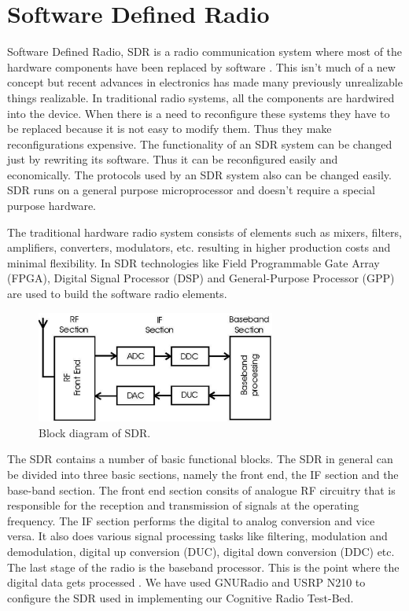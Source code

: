 \chapter{Software Defined Radio}

Software Defined Radio, SDR is a radio communication system where most of the 
hardware components have been replaced by software \cite{wikiSDR}. This isn't
much of a new concept but recent advances in electronics has made many
previously unrealizable things realizable. In traditional
radio systems, all the components are hardwired into the device. When there is
a need to reconfigure these systems they have to be replaced because it is
not easy to modify them. Thus they make reconfigurations expensive. The 
functionality of an SDR system can be changed just by rewriting its software.
Thus it can be reconfigured easily and economically.
The protocols used by an SDR system also can be changed
easily. SDR runs on a general
purpose microprocessor and doesn't require a special purpose hardware.

The traditional hardware radio system consists of elements such as mixers, 
filters, amplifiers, converters, modulators, etc. resulting in higher 
production costs and minimal flexibility. In SDR technologies like 
Field Programmable Gate Array (FPGA), Digital Signal Processor (DSP) and 
General-Purpose Processor (GPP) are used to build the software radio elements.


\begin{figure}
  \centering
  \includegraphics[width=0.7\textwidth]{../images/sdrBlock}
  \caption{Block diagram of SDR.}
  \label{sdrBlock}
\end{figure}

The SDR contains a number of basic functional blocks.
The SDR in general can be divided into three basic sections, namely the front
end, the IF section and the base-band section. The front end section consits 
of analogue RF circuitry that is responsible for the reception and 
transmission of signals at the operating frequency. The IF section performs
the digital to analog conversion and vice versa. It also does various signal 
processing tasks like filtering, modulation and demodulation, digital up 
conversion (DUC), digital down conversion (DDC) etc. The last stage of the 
radio is the baseband processor. This is the point where the digital data 
gets processed \cite{miller08}\cite{kranthi13}.
We have used GNURadio and USRP N210 to configure the SDR used in implementing
our Cognitive Radio Test-Bed. 

